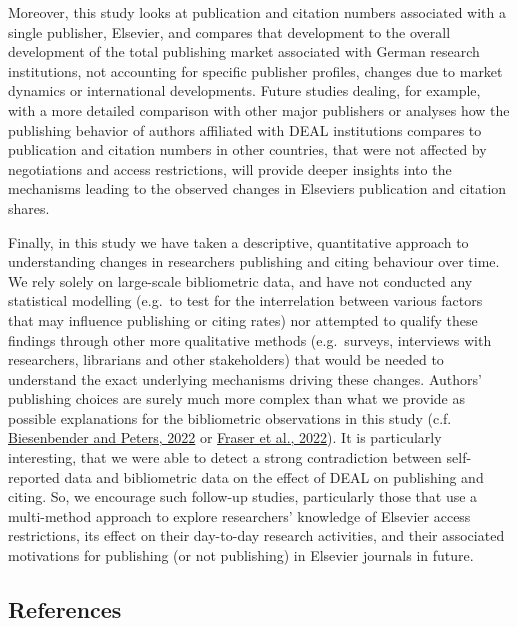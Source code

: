 \documentclass[
]{article}
\begin{document}
Moreover, this study looks at publication and citation numbers associated with a single publisher, Elsevier, and compares that development to the overall development of the total publishing market associated with German research institutions, not accounting for specific publisher profiles, changes due to market dynamics or international developments. Future studies dealing, for example, with a more detailed comparison with other major publishers or analyses how the publishing behavior of authors affiliated with DEAL institutions compares to publication and citation numbers in other countries, that were not affected by negotiations and access restrictions, will provide deeper insights into the mechanisms leading to the observed changes in Elseviers publication and citation shares.

Finally, in this study we have taken a descriptive, quantitative approach to understanding changes in researchers publishing and citing behaviour over time. We rely solely on large-scale bibliometric data, and have not conducted any statistical modelling (e.g.~to test for the interrelation between various factors that may influence publishing or citing rates) nor attempted to qualify these findings through other more qualitative methods (e.g.~surveys, interviews with researchers, librarians and other stakeholders) that would be needed to understand the exact underlying mechanisms driving these changes. Authors' publishing choices are surely much more complex than what we provide as possible explanations for the bibliometric observations in this study (c.f. \href{https://doi.org/10.5281/zenodo.6974779}{Biesenbender and Peters, 2022} or \href{https://journals.plos.org/plosone/article?id=10.1371/journal.pone.0274441}{Fraser et al., 2022}). It is particularly interesting, that we were able to detect a strong contradiction between self-reported data and bibliometric data on the effect of DEAL on publishing and citing. So, we encourage such follow-up studies, particularly those that use a multi-method approach to explore researchers' knowledge of Elsevier access restrictions, its effect on their day-to-day research activities, and their associated motivations for publishing (or not publishing) in Elsevier journals in future.

\hypertarget{references}{%
\subsection*{References}\label{references}}
\end{document}
